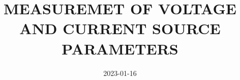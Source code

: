 \documentclass[a4paper]{article}
\title{MEASUREMET OF VOLTAGE AND CURRENT SOURCE PARAMETERS}
\date{2023-01-16}
\begin{document}

\maketitle
\tableofcontents
\pagebreak





\end{document}
